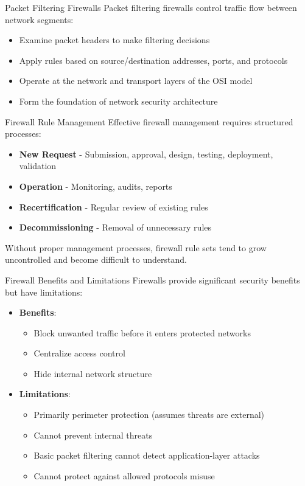 \begin{definition}{Packet Filtering Firewalls}
Packet filtering firewalls control traffic flow between network segments:
\begin{itemize}
    \item Examine packet headers to make filtering decisions
    \item Apply rules based on source/destination addresses, ports, and protocols
    \item Operate at the network and transport layers of the OSI model
    \item Form the foundation of network security architecture
\end{itemize}
\end{definition}

\begin{concept}{Firewall Rule Management}
Effective firewall management requires structured processes:
\begin{itemize}
    \item \textbf{New Request} - Submission, approval, design, testing, deployment, validation
    \item \textbf{Operation} - Monitoring, audits, reports
    \item \textbf{Recertification} - Regular review of existing rules
    \item \textbf{Decommissioning} - Removal of unnecessary rules
\end{itemize}
Without proper management processes, firewall rule sets tend to grow uncontrolled and become difficult to understand.
\end{concept}

\begin{theorem}{Firewall Benefits and Limitations}
Firewalls provide significant security benefits but have limitations:
\begin{itemize}
    \item \textbf{Benefits}:
    \begin{itemize}
        \item Block unwanted traffic before it enters protected networks
        \item Centralize access control
        \item Hide internal network structure
    \end{itemize}
    \item \textbf{Limitations}:
    \begin{itemize}
        \item Primarily perimeter protection (assumes threats are external)
        \item Cannot prevent internal threats
        \item Basic packet filtering cannot detect application-layer attacks
        \item Cannot protect against allowed protocols misuse
    \end{itemize}
\end{itemize}
\end{theorem}

